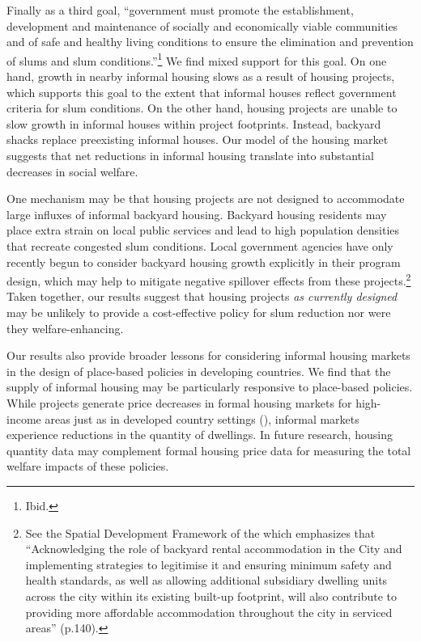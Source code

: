 \documentclass[12pt]{article}
\begin{document}
Finally as a third goal, ``government must promote the establishment, development and maintenance of socially and economically viable communities and of safe and healthy living conditions to ensure the elimination and prevention of slums and slum conditions.''\footnote{Ibid.}  We find mixed support for this goal.  On one hand, growth in nearby informal housing slows as a result of housing projects, which supports this goal to the extent that informal houses reflect government criteria for slum conditions.  On the other hand, housing projects are unable to slow growth in informal houses within project footprints.  Instead, backyard shacks replace preexisting informal houses.  Our model of the housing market suggests that net reductions in informal housing translate into substantial decreases in social welfare.  

One mechanism may be that housing projects are not designed to accommodate large influxes of informal backyard housing.  Backyard housing residents may place extra strain on local public services and lead to high population densities that recreate congested slum conditions.  Local government agencies have only recently begun to consider backyard housing growth explicitly in their program design, which may help to mitigate negative spillover effects from these projects.\footnote{ See the Spatial Development Framework of the \cite{sdf} which emphasizes that ``Acknowledging the role of backyard rental accommodation in the City and implementing strategies to legitimise it and ensuring minimum safety and health standards, as well as allowing additional subsidiary dwelling units across the city within its existing built-up footprint, will also contribute to providing more affordable accommodation throughout the city in serviced areas'' (p.140).}  Taken together, our results suggest that housing projects \textit{as currently designed} may be unlikely to provide a cost-effective policy for slum reduction nor were they welfare-enhancing.

Our results also provide broader lessons for considering informal housing markets in the design of place-based policies in developing countries.  We find that the supply of informal housing may be particularly responsive to place-based policies.  While projects generate price decreases in formal housing markets for high-income areas just as in developed country settings (\cite{diamond2016wants}), informal markets experience reductions in the quantity of dwellings.  In future research, housing quantity data may complement formal housing price data for measuring the total welfare impacts of these policies.  
\end{document}
